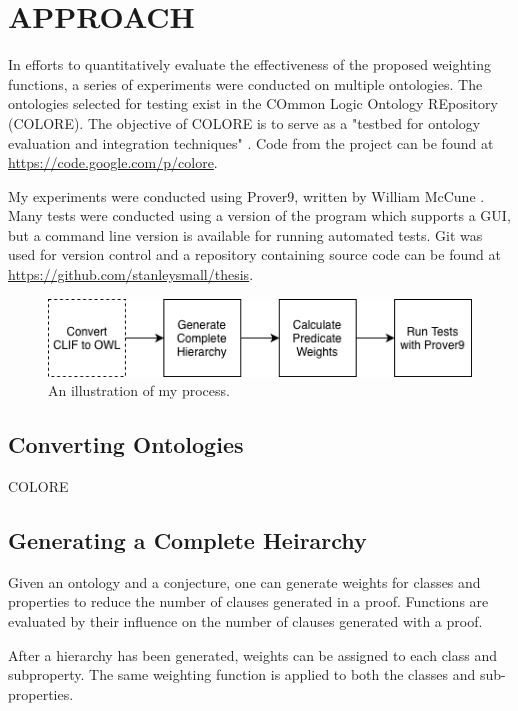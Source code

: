 \documentclass{article}
\begin{document}
\newpage
\vspace*{.05in}
\section{\MakeUppercase{Approach}}
In efforts to quantitatively evaluate the effectiveness of the proposed weighting functions, a series of experiments were conducted on multiple ontologies. The ontologies selected for testing exist in the COmmon Logic Ontology REpository (COLORE). The objective of COLORE is to serve as a "testbed for ontology evaluation and integration techniques" \cite{gruninger2012specifying}. Code from the project can be found at \url{https://code.google.com/p/colore}. 

My experiments were conducted using Prover9, written by William McCune \cite{mccune2005prover9}. Many tests were conducted using a version of the program which supports a GUI, but a command line version is available for running automated tests. 
Git was used for version control and a repository containing source code can be found at \url{https://github.com/stanleysmall/thesis}.

\begin{figure}[h]
\centering
\includegraphics[width=6in]{flowchart}
\caption{An illustration of my process.}
\label{fig:flowchart}
\end{figure}

\subsection{Converting Ontologies}
COLORE 


\subsection{Generating a Complete Heirarchy}

Given an ontology and a conjecture, one can generate weights for classes and properties to reduce the number of clauses generated in a proof. Functions are evaluated by their influence on the number of clauses generated with a proof. 

After a hierarchy has been generated, weights can be assigned to each class and subproperty. The same weighting function is applied to both the classes and sub-properties. 
\end{document}
